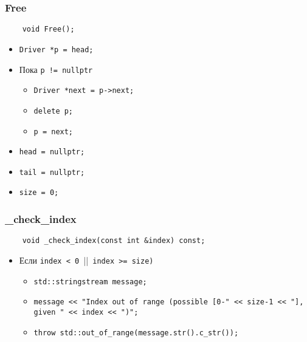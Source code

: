 \subsubsection{Free}

\begin{lstlisting}
    void Free();
\end{lstlisting}

\begin{itemize}
    \item \verb|Driver *p = head;|
    \item Пока \verb|p != nullptr|
        \begin{itemize}
            \item \verb|Driver *next = p->next;|
            \item \verb|delete p;|
            \item \verb|p = next;|
        \end{itemize}
    \item \verb|head = nullptr;|
    \item \verb|tail = nullptr;|
    \item \verb|size = 0;|
\end{itemize}

\subsubsection{\_check\_index}

\begin{lstlisting}
    void _check_index(const int &index) const;
\end{lstlisting}

\begin{itemize}
    \item Если \verb|index < 0 |||\verb| index >= size)|
        \begin{itemize}
            \item \verb|std::stringstream message;|
            \item \verb|message << "Index out of range (possible [0-" << size-1 << "], given " << index << ")";|
            \item \verb|throw std::out_of_range(message.str().c_str());|
        \end{itemize}
\end{itemize}

